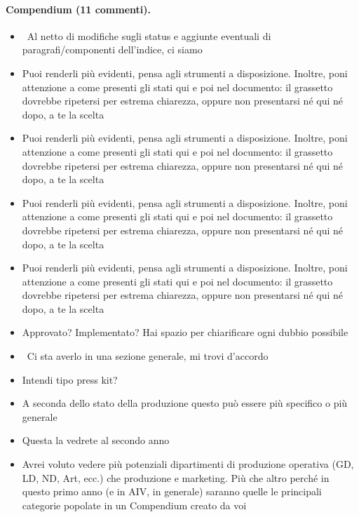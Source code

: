 \paragraph{Compendium (11 commenti).}
{\small
\begin{itemize}
  \item {} \rvBene\ Al netto di modifiche sugli status e aggiunte eventuali di paragrafi/componenti dell'indice, ci siamo
  \item {} Puoi renderli più evidenti, pensa agli strumenti a disposizione. Inoltre, poni attenzione a come presenti gli stati qui e poi nel documento: il grassetto dovrebbe ripetersi per estrema chiarezza, oppure non presentarsi né qui né dopo, a te la scelta
  \item {} Puoi renderli più evidenti, pensa agli strumenti a disposizione. Inoltre, poni attenzione a come presenti gli stati qui e poi nel documento: il grassetto dovrebbe ripetersi per estrema chiarezza, oppure non presentarsi né qui né dopo, a te la scelta
  \item {} Puoi renderli più evidenti, pensa agli strumenti a disposizione. Inoltre, poni attenzione a come presenti gli stati qui e poi nel documento: il grassetto dovrebbe ripetersi per estrema chiarezza, oppure non presentarsi né qui né dopo, a te la scelta
  \item {} Puoi renderli più evidenti, pensa agli strumenti a disposizione. Inoltre, poni attenzione a come presenti gli stati qui e poi nel documento: il grassetto dovrebbe ripetersi per estrema chiarezza, oppure non presentarsi né qui né dopo, a te la scelta
  \item {} Approvato? Implementato? Hai spazio per chiarificare ogni dubbio possibile
  \item {} \rvBene\ Ci sta averlo in una sezione generale, mi trovi d'accordo
  \item {} Intendi tipo press kit?
  \item {} A seconda dello stato della produzione questo può essere più specifico o più generale
  \item {} Questa la vedrete al secondo anno
  \item {} Avrei voluto vedere più potenziali dipartimenti di produzione operativa (GD, LD, ND, Art, ecc.) che produzione e marketing. Più che altro perché in questo primo anno (e in AIV, in generale) saranno quelle le principali categorie popolate in un Compendium creato da voi
\end{itemize}
}
